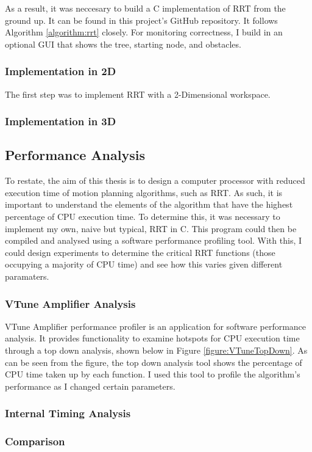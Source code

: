     As a result, it was neccesary to build a C implementation of RRT from the ground up. It can be found in this project's GitHub repository. It follows Algorithm \ref{algorithm:rrt} closely. For monitoring correctness, I build in an optional \ac{GUI} that shows the tree, starting node, and obstacles. 

    \subsubsection{Implementation in 2D}
    The first step was to implement RRT with a 2-Dimensional workspace. 
    

    \subsubsection{Implementation in 3D}
    

    


\subsection{Performance Analysis}
    To restate, the aim of this thesis is to design a computer processor with reduced execution time of motion planning algorithms, such as \ac{RRT}. As such, it is important to understand the elements of the algorithm that have the highest percentage of CPU execution time. To determine this, it was necessary to implement my own, naive but typical, \ac{RRT} in C. This program could then be compiled and analysed using a software performance profiling tool. With this, I could design experiments to determine the critical RRT functions (those occupying a majority of CPU time) and see how this varies given different paramaters.

    \subsubsection{VTune Amplifier Analysis}
        VTune Amplifier performance profiler is an application for software performance analysis. It provides functionality to examine hotspots for CPU execution time through a top down analysis, shown below in Figure \ref{figure:VTuneTopDown}. As can be seen from the figure, the top down analysis tool shows the percentage of CPU time taken up by each function. I used this tool to profile the algorithm's performance as I changed certain parameters.
        

    \subsubsection{Internal Timing Analysis}

    \subsubsection{Comparison}